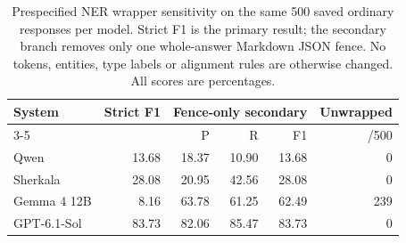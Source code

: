 \begin{table}[t]
\centering\footnotesize
\caption{Prespecified NER wrapper sensitivity on the same 500 saved ordinary responses per model. Strict F1 is the primary result; the secondary branch removes only one whole-answer Markdown JSON fence. No tokens, entities, type labels or alignment rules are otherwise changed. All scores are percentages.}
\label{tab:fence}
\begin{tabular}{lrrrrr}
\toprule
System & Strict F1 & \multicolumn{3}{c}{Fence-only secondary} & Unwrapped\\\cmidrule(lr){3-5} & & P & R & F1 & /500\\
\midrule
Qwen & 13.68 & 18.37 & 10.90 & 13.68 & 0\\
Sherkala & 28.08 & 20.95 & 42.56 & 28.08 & 0\\
Gemma 4 12B & 8.16 & 63.78 & 61.25 & 62.49 & 239\\
GPT-6.1-Sol & 83.73 & 82.06 & 85.47 & 83.73 & 0\\
\bottomrule
\end{tabular}
\end{table}
